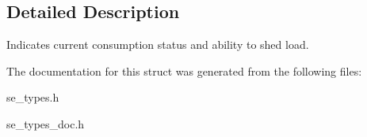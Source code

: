 \subsection{Detailed Description}
Indicates current consumption status and ability to shed load. 

The documentation for this struct was generated from the following files\+:\begin{DoxyCompactItemize}
\item 
se\+\_\+types.\+h\item 
se\+\_\+types\+\_\+doc.\+h\end{DoxyCompactItemize}
